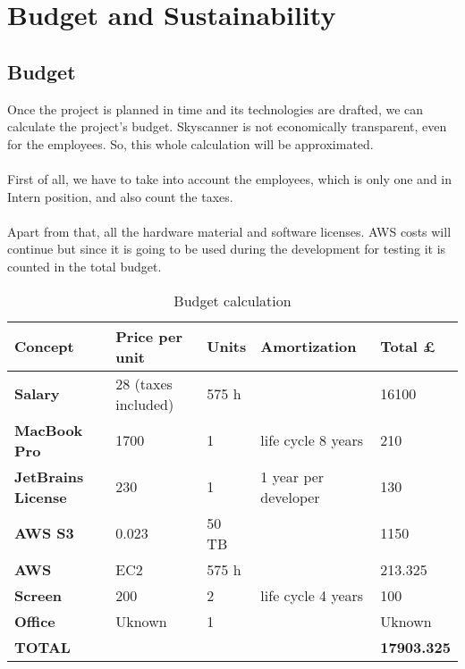 
\chapter{Budget and Sustainability}

\label{chapter06}

\section{Budget}

Once the project is planned in time and its technologies are drafted, we can calculate the project’s budget.
Skyscanner is not economically transparent, even for the employees. So, this whole calculation will be approximated.
\\\\
First of all, we have to take into account the employees, which is only one and in Intern position, and also count the taxes.
\\\\
Apart from that, all the hardware material and software licenses. AWS costs will continue but since it is going to be used during the development for testing it is counted in the total budget.

\begin{table}[H]
\centering
\begin{tabular}{|l|l|l|l|l|}
\hline
\textbf{Concept}           & \textbf{Price per unit} & \textbf{Units} & \textbf{Amortization} & \textbf{Total £}   \\ \hline
\textbf{Salary}            & 28 (taxes included)     & 575 h          &                       & 16100              \\ \hline
\textbf{MacBook Pro}       & 1700                    & 1              & life cycle 8 years    & 210                \\ \hline
\textbf{JetBrains License} & 230                     & 1              & 1 year per developer  & 130                \\ \hline
\textbf{AWS S3}            & 0.023                   & 50 TB          &                       & 1150               \\ \hline
\textbf{AWS}               & EC2                     & 575 h          &                       & 213.325            \\ \hline
\textbf{Screen}            & 200                     & 2              & life cycle 4 years    & 100                \\ \hline
\textbf{Office}            & Uknown                  & 1              &                       & Uknown             \\ \hline
\textbf{TOTAL}             &                         &                &                       & \textbf{17903.325} \\ \hline
\end{tabular}
\caption{Budget calculation}
\label{budget-calculation}
\end{table}

